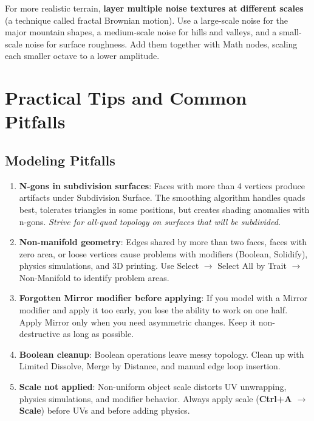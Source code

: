 \begin{tipbox}
For more realistic terrain, \textbf{layer multiple noise textures at different scales} (a technique called fractal Brownian motion). Use a large-scale noise for the major mountain shapes, a medium-scale noise for hills and valleys, and a small-scale noise for surface roughness. Add them together with Math nodes, scaling each smaller octave to a lower amplitude.
\end{tipbox}



\section{Practical Tips and Common Pitfalls}
\label{sec:pitfalls}

\subsection{Modeling Pitfalls}

\begin{enumerate}[leftmargin=2em]
  \item \textbf{N-gons in subdivision surfaces}: Faces with more than 4 vertices produce artifacts under Subdivision Surface. The smoothing algorithm handles quads best, tolerates triangles in some positions, but creates shading anomalies with n-gons. \textit{Strive for all-quad topology on surfaces that will be subdivided.}

  \item \textbf{Non-manifold geometry}: Edges shared by more than two faces, faces with zero area, or loose vertices cause problems with modifiers (Boolean, Solidify), physics simulations, and 3D printing. Use Select $\rightarrow$ Select All by Trait $\rightarrow$ Non-Manifold to identify problem areas.

  \item \textbf{Forgotten Mirror modifier before applying}: If you model with a Mirror modifier and apply it too early, you lose the ability to work on one half. Apply Mirror only when you need asymmetric changes. Keep it non-destructive as long as possible.

  \item \textbf{Boolean cleanup}: Boolean operations leave messy topology. Clean up with Limited Dissolve, Merge by Distance, and manual edge loop insertion.

  \item \textbf{Scale not applied}: Non-uniform object scale distorts UV unwrapping, physics simulations, and modifier behavior. Always apply scale (\textbf{Ctrl+A $\rightarrow$ Scale}) before UVs and before adding physics.
\end{enumerate}

